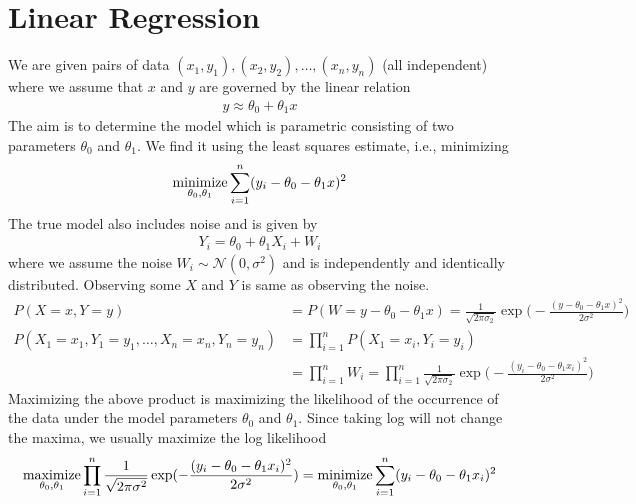 \documentclass[../probability-notes.tex]{subfiles}
\begin{document}
    \chapter{Linear Regression}
    We are given pairs of data $(x_{1},y_{1}), (x_{2},y_{2}), \ldots, (x_{n},y_{n})$ (all independent) where we assume that $x$ and $y$ are governed by the linear relation
    \begin{align*}
        y \approx \theta_{0} + \theta_{1}x
    \end{align*}
    The aim is to determine the model which is parametric consisting of two parameters $\theta_{0}$ and $\theta_{1}$. We find it using the least squares estimate, i.e., minimizing
    \begin{align*}
        \operatorname*{minimize}_{\theta_{0}, \theta_{1}} \sum_{i=1}^{n} (y_{i} - \theta_{0} - \theta_{1}x)^{2}
    \end{align*}
    The true model also includes noise and is given by
    \begin{align*}
        Y_{i} = \theta_{0} + \theta_{1}X_{i} + W_{i}
    \end{align*}
    where we assume the noise $W_{i} \sim \mathcal{N}(0, \sigma^{2})$ and is independently and identically distributed. Observing some $X$ and $Y$ is same as observing the noise.
    \begin{align*}
        P(X=x,Y=y) &= P(W=y-\theta_{0}-\theta_{1}x) = \frac{1}{\sqrt{2\pi \sigma_{2}}} \exp\bigg(-\frac{(y-\theta_{0}-\theta_{1}x)^{2}}{2 \sigma^{2}}\bigg)\\
        P(X_{1}=x_{1},Y_{1}=y_{1}, \ldots, X_{n}=x_{n},Y_{n}=y_{n}) &= \prod_{i=1}^{n} P(X_{1}=x_{i},Y_{i}=y_{i})\\
        &= \prod_{i=1}^{n} W_{i} = \prod_{i=1}^{n} \frac{1}{\sqrt{2\pi\sigma_{2}}} \exp\bigg(-\frac{(y_{i}-\theta_{0}-\theta_{1}x_{i})^{2}}{2\sigma^{2}}\bigg)
    \end{align*}
    Maximizing the above product is maximizing the likelihood of the occurrence of the data under the model parameters $\theta_{0}$ and $\theta_{1}$. Since taking log will not change the maxima, we usually maximize the log likelihood
    \begin{align*}
        \operatorname*{maximize}_{\theta_{0}, \theta_{1}} \prod_{i=1}^{n} \frac{1}{\sqrt{2\pi\sigma^{2}}} \exp(-\frac{(y_{i}-\theta_{0}-\theta_{1}x_{i})^{2}}{2\sigma^{2}}) = \operatorname*{minimize}_{\theta_{0}, \theta_{1}} \sum_{i=1}^{n} (y_{i}-\theta_{0}-\theta_{1}x_{i})^{2}
    \end{align*}
\end{document}

